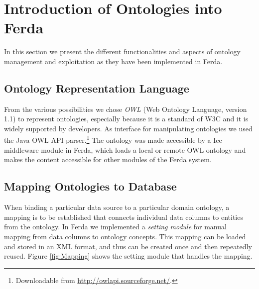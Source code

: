 \section{Introduction of Ontologies into Ferda} \label{OntologiesFerda}

In this section we present the different functionalities and aspects of ontology management and exploitation as they have been implemented in Ferda.

\subsection{Ontology Representation Language}

From the various possibilities we chose \emph{OWL} (Web Ontology Language, version 1.1) to represent ontologies, especially because it is a standard of W3C and it is widely supported by developers. 
As interface for manipulating ontologies we used the Java OWL API parser.\footnote{%
Downloadable from \url{http://owlapi.sourceforge.net/}.} 
The ontology was made accessible by a Ice middleware module in Ferda, which loads a local or remote OWL ontology and makes the content accessible for other modules of the Ferda system. 

\subsection{Mapping Ontologies to Database}
\label{sec:mapping}

When binding a particular data source to a particular domain ontology, a mapping is to be established that connects individual data columns to entities from the ontology.
In Ferda we implemented a \emph{setting module} for manual mapping from data columns to ontology concepts. 
This mapping can be loaded and stored in an XML format, and thus can be created once and then repeatedly reused. 
Figure \ref{fig:Mapping} shows the setting module that handles the mapping.

